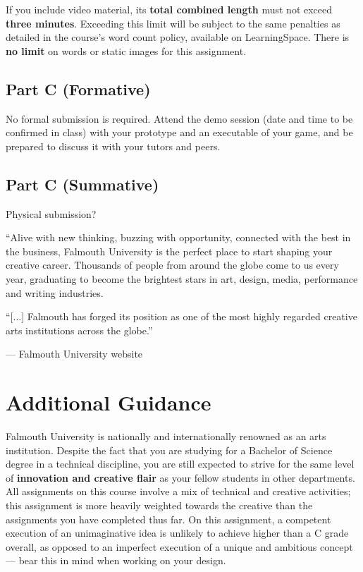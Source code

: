\documentclass{../fal_assignment}
\begin{document}
If you include video material, its \textbf{total combined length} must not exceed \textbf{three minutes}.
Exceeding this limit will be subject to the same penalties as detailed in the course's word count policy,
available on LearningSpace.
There is \textbf{no limit} on words or static images for this assignment.

\subsection*{Part C (Formative)}

No formal submission is required.
Attend the demo session (date and time to be confirmed in class)
with your prototype and an executable of your game,
and be prepared to discuss it with your tutors and peers.

\subsection*{Part C (Summative)}

Physical submission?

\begin{marginquote}
    ``Alive with new thinking, buzzing with opportunity, connected with the best in the business,
    Falmouth University is the perfect place to start shaping your creative career.
    Thousands of people from around the globe come to us every year,
    graduating to become the brightest stars in art, design, media, performance and writing industries.

    ``[...]
    Falmouth has forged its position as one of the most highly regarded creative arts institutions across the globe.''
    
    --- Falmouth University website
\end{marginquote}
\section*{Additional Guidance}

Falmouth University is nationally and internationally renowned as an arts institution.
Despite the fact that you are studying for a Bachelor of Science degree in a technical discipline,
you are still expected to strive for the same level of \textbf{innovation and creative flair}
as your fellow students in other departments.
All assignments on this course involve a mix of technical and creative activities;
this assignment is more heavily weighted towards the creative than the assignments you have completed thus far.
On this assignment, a competent execution of an unimaginative idea is unlikely to achieve higher than a C grade overall,
as opposed to an imperfect execution of a unique and ambitious concept
--- bear this in mind when working on your design.
\end{document}
